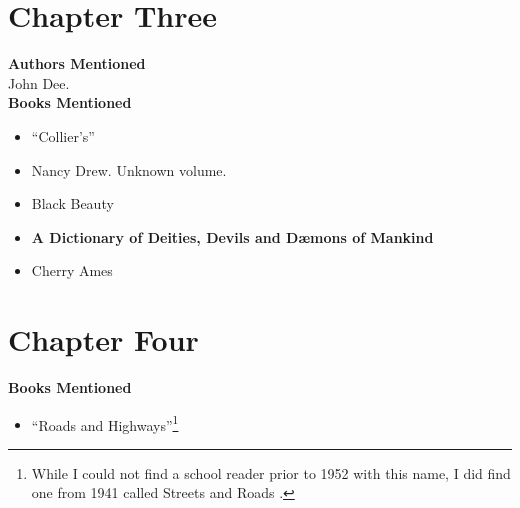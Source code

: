 \documentclass[twoside,10pt]{report}
\begin{document}
\section{Chapter Three}
\textbf{Authors Mentioned}\\
John Dee.
\\


\textbf{Books Mentioned}
\begin{itemize}
\item ``Collier’s'' \cite{1952b}
\item Nancy Drew. Unknown volume.\cite{NancyDrew}
\item Black Beauty \cite{Sewell1887}
\item \textbf{A Dictionary of Deities, Devils and Dæmons of Mankind} \cite{St.Phalle}
\item Cherry Ames \cite{WellsPre1952}
\end{itemize}

\section{Chapter Four}
\textbf{Books Mentioned}\\
\begin{itemize}
\item ``Roads and Highways''\footnote{While I could not find a school reader prior to 1952 with this name, I did find one from 1941 called Streets and Roads \cite{Gray1941}.} \cite{UnknownRH}
\end{itemize}
\end{document}

